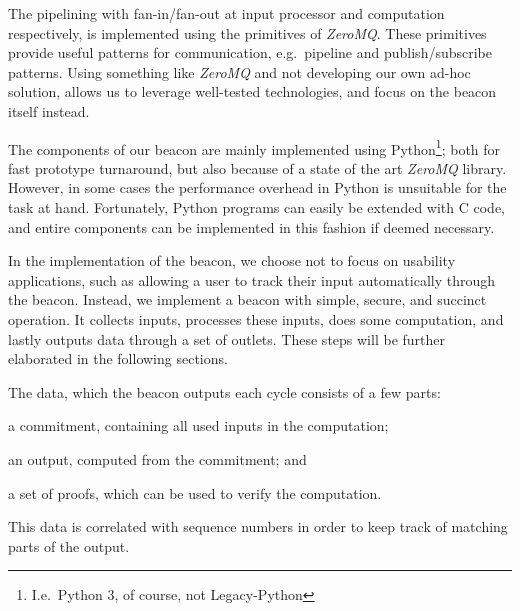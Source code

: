 The pipelining with fan-in/fan-out at input processor and computation respectively, is implemented using the primitives of \textit{ZeroMQ}.
These primitives provide useful patterns for communication, e.g.\ pipeline and publish/subscribe patterns.
Using something like \textit{ZeroMQ} and not developing our own ad-hoc solution, allows us to leverage well-tested technologies, and focus on the beacon itself instead.

The components of our beacon are mainly implemented using Python\footnote{I.e.\ Python 3, of course, not Legacy-Python}; both for fast prototype turnaround, but also because of a state of the art \textit{ZeroMQ} library.
However, in some cases the performance overhead in Python is unsuitable for the task at hand.
Fortunately, Python programs can easily be extended with C code, and entire components can be implemented in this fashion if deemed necessary.

In the implementation of the beacon, we choose not to focus on usability applications, such as allowing a user to track their input automatically through the beacon.
Instead, we implement a beacon with simple, secure, and succinct operation.
It collects inputs, processes these inputs, does some computation, and lastly outputs data through a set of outlets.
These steps will be further elaborated in the following sections.

The data, which the beacon outputs each cycle consists of a few parts:
\begin{eletterate*}
\item a commitment, containing all used inputs in the computation;
\item an output, computed from the commitment; and
\item a set of proofs, which can be used to verify the computation.
\end{eletterate*}
This data is correlated with sequence numbers in order to keep track of matching parts of the output.

